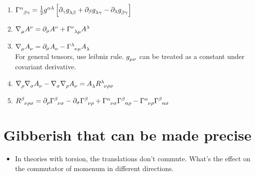 \documentclass{report}
\begin{document}
\begin{itemize}
\begin{enumerate}
      \item $\Gamma\indices{^\alpha_ \beta_ \gamma} = \frac{1}{2}g\indices{^\alpha^\lambda}\left[\partial_ \gamma g\indices{_ \lambda_ \beta} + \partial_ \beta g\indices{_\lambda_ \gamma}-\partial_\lambda g\indices{_ \beta_ \gamma}\right]$
      \item
        $\nabla\indices{_\mu}A\indices{^\nu} = \partial_{\mu}A\indices{^\nu} + \Gamma\indices{^\nu_\lambda_\mu}A\indices{^\lambda}$
      \item
        $\nabla\indices{_\mu}A\indices{_\nu} = \partial_{\mu}A\indices{_\nu} - \Gamma\indices{^\lambda_\nu_\mu}A\indices{_\lambda}$ \\
        For general tensors, use leibniz rule. $g\indices{_\mu_\nu}$ can be treated as a constant under covariant derivative.

      \item $\nabla\indices{_ \rho}\nabla\indices{_\sigma}A\indices{_\nu} - \nabla\indices{_\sigma}\nabla\indices{_ \rho}A\indices{_ \nu} = A\indices{_ \lambda}R\indices{^\lambda_\nu_ \rho_\sigma}$

      \item $R\indices{^\beta_\nu_ \rho_\sigma} = \partial_ {\rho}\Gamma\indices{^\beta_\nu_\sigma}-\partial_ {\sigma}\Gamma\indices{^\beta_\nu_\rho} + \Gamma\indices{^\alpha_\nu_\sigma} \Gamma\indices{^\beta_ \alpha_ \rho} - \Gamma\indices{^\alpha_\nu_ \rho} \Gamma\indices{^\beta_ \alpha_ \sigma}$

    \end{enumerate}
\end{itemize}

\chapter{Gibberish that can be made precise}

\begin{itemize}
  \item In theories with torsion, the translations don't commute. What's the effect on the commutator of momenum in different directions.

\end{itemize}
\end{document}
